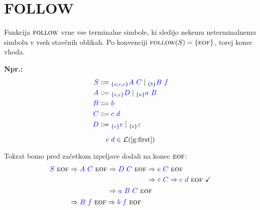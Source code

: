 \documentclass{article}
\newcommand{\Ex}{\textbf{Npr.:}\ }
\newcommand{\OK}{\ \checkmark}
\newcommand{\FOLLOW}{\textsc{follow}}
\newcommand{\EOF}{\textsc{eof}}
\newcommand{\Symbol}[1]{\textcolor{blue}{#1}}
\newcommand{\Null}{\varepsilon}
\newcommand{\Language}[1]{\mathcal{L}(#1)}
\newcommand{\MathRef}[1]{\text{\ref{#1}}}
\newcommand{\Arrow}{\Coloneq}
\newcommand{\Derive}{\Rightarrow}
\newcommand{\Seq}{\ }
\newcommand{\Union}{\mathrel{|}}
\newcommand{\Lookahead}[1]{{}_{\{{#1}\}}}
\begin{document}

\section{FOLLOW}
Funkcija $\FOLLOW$ vrne vse terminalne simbole, ki sledijo nekemu neterminalnemu simbolu v vseh stavčnih oblikah.
Po konvenciji $\FOLLOW(S) = \{\EOF\}$, torej konec vhoda.

\Ex
\begin{equation*}
  \begin{aligned}
    \Symbol{S} &\Arrow \Lookahead{\Symbol{a}, \Symbol{c}, \Symbol{e}} \Symbol{A} \Seq \Symbol{C} \Union \Lookahead{\Symbol{b}} \Symbol{B} \Seq \Symbol{f} \\
    \Symbol{A} &\Arrow \Lookahead{\Symbol{e}, \Null} \Symbol{D} \Union \Lookahead{\Symbol{a}} \Symbol{a} \Seq \Symbol{B} \\
    \Symbol{B} &\Arrow \Symbol{b}\\
    \Symbol{C} &\Arrow \Symbol{c} \Seq \Symbol{d}\\
    \Symbol{D} &\Arrow \Lookahead{\Symbol{e}} \Symbol{e} \Union \Lookahead{\Null} \Null
  \end{aligned}
\end{equation*}

\begin{equation*}
  \Symbol{c} \Seq \Symbol{d} \in \Language{\MathRef{g:first}}
\end{equation*}

Tokrat bomo pred začetkom izpeljave dodali na konec $\EOF$:
\begin{equation*}
  \Symbol{S} \Seq \EOF \begin{aligned}[t]
    &\Derive \Symbol{A} \Seq \Symbol{C} \Seq \EOF \begin{aligned}[t]
      &\Derive \Symbol{D} \Seq \Symbol{C} \Seq \EOF \begin{aligned}[t]
        &\Derive \Symbol{e} \Seq \Symbol{C} \Seq \EOF\\
        &\Derive \Null \Seq \Symbol{C} \Derive \Symbol{c} \Seq \Symbol{d} \Seq \EOF \OK
      \end{aligned}\\
      &\Derive \Symbol{a} \Seq \Symbol{B} \Seq \Symbol{C} \Seq \EOF
    \end{aligned}\\
    &\Derive \Symbol{B} \Seq \Symbol{f} \Seq \EOF \Derive \Symbol{b} \Seq \Symbol{f} \Seq \EOF
  \end{aligned}
\end{equation*}
\end{document}
